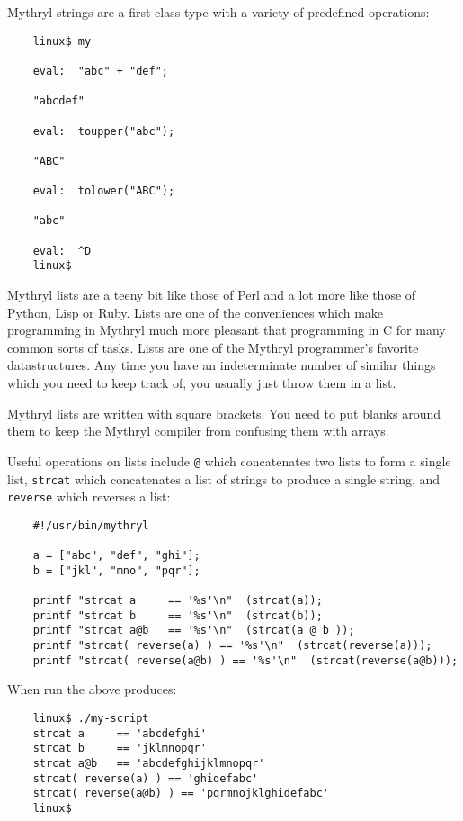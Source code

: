 Mythryl strings are a first-class type with a 
variety of predefined operations:

\begin{verbatim}
    linux$ my

    eval:  "abc" + "def";

    "abcdef"

    eval:  toupper("abc");

    "ABC"

    eval:  tolower("ABC");

    "abc"

    eval:  ^D
    linux$
\end{verbatim}


Mythryl lists are a teeny bit like those of Perl and a lot more like those of 
Python, Lisp or Ruby.  Lists are one of the conveniences which make programming 
in Mythryl much more pleasant that programming in C for many common sorts of 
tasks.  Lists are one of the Mythryl programmer's favorite datastructures. 
Any time you have an indeterminate number of similar things which you need 
to keep track of, you usually just throw them in a list. 

Mythryl lists are written with square brackets.  You need to put blanks around 
them to keep the Mythryl compiler from confusing them with arrays.

Useful operations on lists include {\tt @} which concatenates two lists to 
form a single list, {\tt strcat} which concatenates a list of strings to 
produce a single string, and {\tt reverse} which reverses a list:

\begin{verbatim}
    #!/usr/bin/mythryl

    a = ["abc", "def", "ghi"];
    b = ["jkl", "mno", "pqr"];

    printf "strcat a     == '%s'\n"  (strcat(a));
    printf "strcat b     == '%s'\n"  (strcat(b));
    printf "strcat a@b   == '%s'\n"  (strcat(a @ b ));
    printf "strcat( reverse(a) ) == '%s'\n"  (strcat(reverse(a)));
    printf "strcat( reverse(a@b) ) == '%s'\n"  (strcat(reverse(a@b)));
\end{verbatim}

When run the above produces:

\begin{verbatim}
    linux$ ./my-script
    strcat a     == 'abcdefghi'
    strcat b     == 'jklmnopqr'
    strcat a@b   == 'abcdefghijklmnopqr'
    strcat( reverse(a) ) == 'ghidefabc'
    strcat( reverse(a@b) ) == 'pqrmnojklghidefabc'
    linux$
\end{verbatim}

